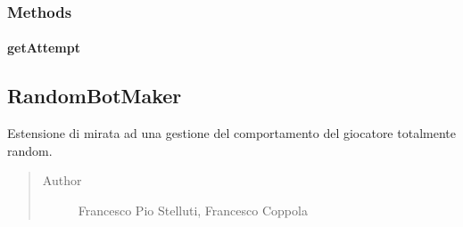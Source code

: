 \documentclass[letterpaper,10pt,italian,openany,oneside]{sphinxmanual}
\begin{document}
\subsubsection{Methods}
\label{\detokenize{source/it/unicam/cs/pa/mastermind/players/RandomBotBreaker:methods}}

\paragraph{getAttempt}
\label{\detokenize{source/it/unicam/cs/pa/mastermind/players/RandomBotBreaker:getattempt}}

\begin{fulllineitems}
\label{\detokenize{source/it/unicam/cs/pa/mastermind/players/RandomBotBreaker:it.unicam.cs.pa.mastermind.players.RandomBotBreaker.getAttempt(InteractionView)}}
\end{fulllineitems}



\subsection{RandomBotMaker}
\label{\detokenize{source/it/unicam/cs/pa/mastermind/players/RandomBotMaker:randombotmaker}}\label{\detokenize{source/it/unicam/cs/pa/mastermind/players/RandomBotMaker::doc}}

\begin{fulllineitems}
\label{\detokenize{source/it/unicam/cs/pa/mastermind/players/RandomBotMaker:it.unicam.cs.pa.mastermind.players.RandomBotMaker}}
Estensione di  mirata ad una gestione del comportamento del giocatore totalmente random.
\begin{quote}\begin{description}
\item[{Author}] \leavevmode
Francesco Pio Stelluti, Francesco Coppola

\end{description}\end{quote}

\end{fulllineitems}
\end{document}
